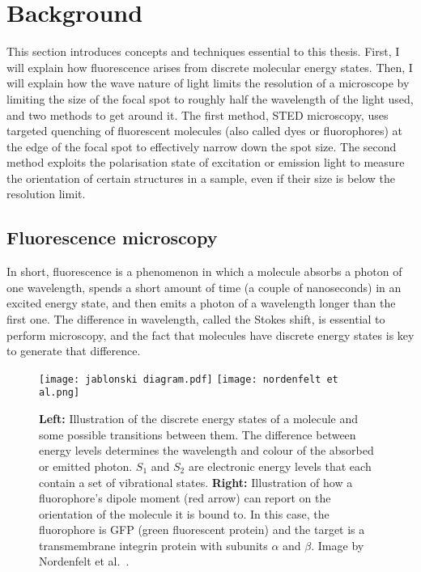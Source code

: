 \chapter{Background}

This section introduces concepts and techniques essential to this thesis. First, I will explain how fluorescence arises from discrete molecular energy states. Then, I will explain how the wave nature of light limits the resolution of a microscope by limiting the size of the focal spot to roughly half the wavelength of the light used, and two methods to get around it. The first method, STED microscopy, uses targeted quenching of fluorescent molecules (also called dyes or fluorophores) at the edge of the focal spot to effectively narrow down the spot size. The second method exploits the polarisation state of excitation or emission light to measure the orientation of certain structures in a sample, even if their size is below the resolution limit.

\section{Fluorescence microscopy}

In short, fluorescence is a phenomenon in which a molecule absorbs a photon of one wavelength, spends a short amount of time (a couple of nanoseconds) in an excited energy state, and then emits a photon of a wavelength longer than the first one. The difference in wavelength, called the Stokes shift, is essential to perform microscopy, and the fact that molecules have discrete energy states is key  to generate that difference.

\begin{figure}
	\centering
	 \texttt{[image: jablonski diagram.pdf]} \hfill \texttt{[image: nordenfelt et al.png]}
	\caption{
		\textbf{Left:} Illustration of the discrete energy states of a molecule and some possible transitions between them. The difference between energy levels determines the wavelength and colour of the absorbed or emitted photon. $ S_1 $ and $ S_2 $ are electronic energy levels that each contain a set of vibrational states. \textbf{Right:} Illustration of how a fluorophore's dipole moment (red arrow) can report on the orientation of the molecule it is bound to. In this case, the fluorophore is GFP (green fluorescent protein) and the target is a transmembrane integrin protein with subunits $ \alpha $ and $ \beta $. Image by Nordenfelt et al.~\cite{Nordenfelt2017}.
	}
	\label{fig:jablonski}
\end{figure}

